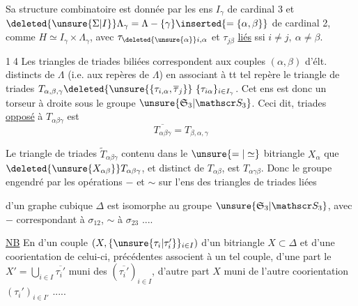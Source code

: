 Sa structure combinatoire est donnée par les ens $I_{\gamma}$ de cardinal 3 et $\deleted{\unsure{\Sigma|I}}\Lambda_{\gamma}=\Lambda-\{\gamma\}\inserted{=\{\alpha,\beta\}}$ de cardinal 2, comme $H\simeq I_{\gamma}\times\Lambda_{\gamma}$, avec $\tau_{\deleted{\unsure{\alpha}}i,\alpha}$ et $\tau_{j\beta}$ \uline{liés} ssi $i\ne j,\ \alpha\ne\beta$. 


\textcircled{14} Les triangles de triades biliées correspondent aux couples $(\alpha,\beta)$ d'élt. distincts de $\Lambda$ (i.e. aux repères de $\Lambda$) en associant à tt tel repère le  triangle de triades $T_{\alpha,\beta,\gamma}\deleted{\unsure{\{\tau_{i,\alpha},\overline{\tau}_{j}}}\ \{\tau_{i\alpha}\}_{i\in I_{\gamma}}$. Cet ens est donc un torseur à droite sous le groupe $\unsure{\mathfrak S_3|\mathscr S_3}$. Ceci dit,   triades \uline{opposé} à $T_{\alpha\beta\gamma}$ est
\[
\overline{T_{\alpha\beta\gamma}}=T_{\beta,\alpha,\gamma}
\]

Le triangle de triades $\widetilde T_{\alpha\beta\gamma}$  contenu dans le $\unsure{=|\simeq}$ bitriangle $X_\alpha$ que $\deleted{\unsure{X_{\alpha\beta}}}T_{\alpha\beta\gamma}$, et distinct de $T_{\alpha\beta}$, est $T_{\alpha\gamma\beta}$. Donc le groupe engendré par les opérations $-$ et $\sim$ sur l'ens des triangles de triades liées


d'un graphe cubique $\Delta$ est isomorphe au groupe $\unsure{\mathfrak S_3|\mathscr S_3}$, avec $-$ correspondant à $\sigma_{12}$, $\sim$ à $\sigma_{23}$ ....

\uline{NB} En  d'un couple $(X,\{\unsure{\tau_i|\tau_i'}\}_{i\in I})$ d'un bitriangle $X\subset\Delta$ et d'une coorientation de celui-ci,  précédentes associent à un tel couple, d'une part le
$X'=\bigcup_{i\in I}\overline{\tau_i'}$  muni des $(\overline{\tau_i'})_{i\in I}$, d'autre part $X$ muni de l'autre coorientation $(\tau_i')_{i\in I'}$ .....

